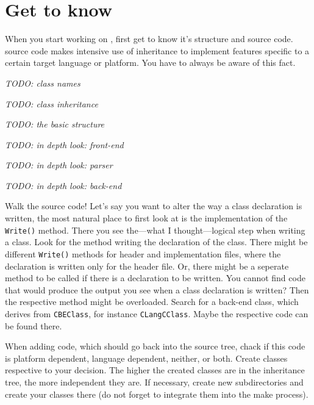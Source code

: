 \section{Get to know \dice}

When you start working on \dice{}, first get to know it's structure and source
code.  \dice{} source code makes intensive use of inheritance to implement
features specific to a certain target language or platform.  You have to
always be aware of this fact.

\emph{TODO: class names}

\emph{TODO: class inheritance}

\emph{TODO: the basic structure}

\emph{TODO: in depth look: front-end}

\emph{TODO: in depth look: parser}

\emph{TODO: in depth look: back-end}

Walk the source code! Let's say you want to alter the way a class declaration
is written, the most natural place to first look at is the implementation of
the \texttt{Write()} method.  There you see the---what I thought---logical
step when writing a class.  Look for the method writing the declaration of the
class. There might be different \texttt{Write()} methods for header and
implementation files, where the declaration is written only for the header
file.  Or, there might be a seperate method to be called if there is a
declaration to be written. You cannot find code that would produce the output
you see when a class declaration is written? Then the respective method might
be overloaded. Search for a back-end class, which derives from
\texttt{CBEClass}, for instance \texttt{CLangCClass}. Maybe the respective
code can be found there.

When adding code, which should go back into the \dice{} source tree, chack if
this code is platform dependent, language dependent, neither, or both.  Create
classes respective to your decision.  The higher the created classes are in
the inheritance tree, the more independent they are.  If necessary, create new
subdirectories and create your classes there (do not forget to integrate them
into the make process).

